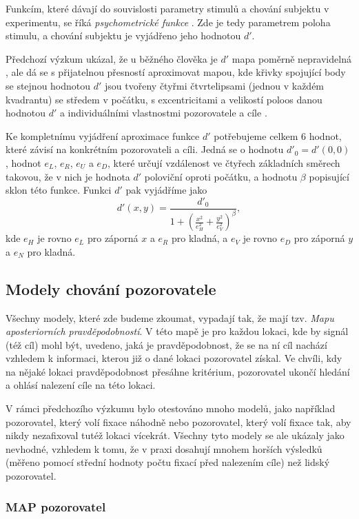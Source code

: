 Funkcím, které dávají do souvislosti parametry stimulů a chování subjektu v
experimentu, se říká {\it psychometrické funkce} \citep{psychophysics}. Zde je
tedy parametrem poloha stimulu, a chování subjektu je vyjádřeno jeho hodnotou
$d'$.

Předchozí výzkum ukázal, že u běžného člověka je $d'$ mapa poměrně
nepravidelná \citep{Najemnik08}, ale dá se s přijatelnou přesností aproximovat mapou, kde křivky
spojující body se stejnou hodnotou $d'$ jsou tvořeny čtyřmi čtvrtelipsami
(jednou v každém kvadrantu) se středem v počátku, s
excentricitami a velikostí poloos danou hodnotou $d'$ a individuálními
vlastnostmi pozorovatele a cíle \citep{Ellipse}. 

Ke kompletnímu vyjádření aproximace funkce $d'$ potřebujeme celkem 6 hodnot,
které závisí na konkrétním pozorovateli a cíli. Jedná se o hodnotu $d'_0 =
d'(0,0)$, hodnot $e_L$, $e_R$, $e_U$ a $e_D$, které určují vzdálenost ve čtyřech
základních směrech takovou, že v nich je hodnota $d'$ poloviční oproti počátku,
a hodnotu $\beta$ popisující sklon této funkce. Funkci $d'$ pak vyjádříme jako
$$ d'(x,y) = \frac{d'_0}{1+\left(\frac{x^2}{e_H^2}+\frac{y^2}{e_V^2}
\right)^\beta}, $$ kde $e_H$ je rovno $e_L$ pro záporná $x$ a $e_R$ pro kladná,
a $e_V$ je rovno $e_D$ pro záporná $y$ a $e_N$ pro kladná.


\subsection{Modely chování pozorovatele}

Všechny modely, které zde budeme zkoumat, vypadají tak, že mají tzv. {\it Mapu
aposteriorních pravděpodobností}. V této mapě je pro každou lokaci, kde by
signál (též cíl) mohl být, uvedeno, jaká je pravděpodobnost, že se na ní cíl
nachází vzhledem k informaci, kterou již o dané lokaci pozorovatel získal. Ve
chvíli, kdy na nějaké lokaci pravděpodobnost přesáhne kritérium, pozorovatel
ukončí hledání a ohlásí nalezení cíle na této lokaci.

V rámci předchozího výzkumu bylo otestováno mnoho modelů, jako například
pozorovatel, který volí fixace náhodně nebo pozorovatel, který volí fixace 
tak, aby nikdy nezafixoval tutéž lokaci vícekrát. Všechny tyto modely se ale ukázaly jako
nevhodné, vzhledem k tomu, že v praxi dosahují mnohem horších výsledků (měřeno
pomocí střední hodnoty počtu fixací před nalezením cíle) než lidský
pozorovatel.

\subsubsection{MAP pozorovatel}

